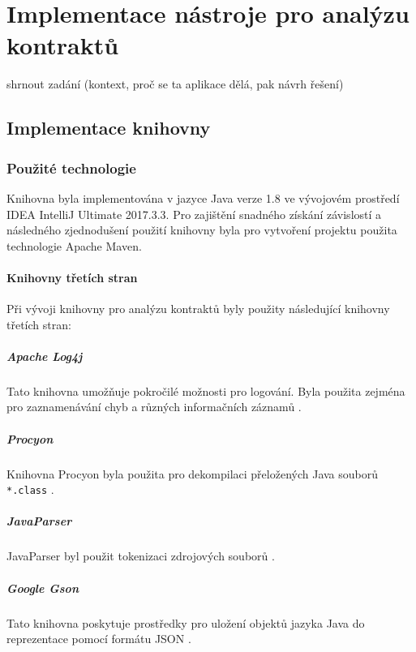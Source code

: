 \chapter{Implementace nástroje pro analýzu kontraktů}

	shrnout zadání (kontext, proč se ta aplikace dělá, pak návrh řešení) 

	\section{Implementace knihovny}
	    \subsection{Použité technologie}
			Knihovna byla implementována v jazyce Java verze 1.8 ve vývojovém prostředí IDEA IntelliJ Ultimate 2017.3.3. Pro zajištění snadného získání závislostí a následného zjednodušení použití knihovny byla pro vytvoření projektu použita technologie Apache Maven.
			
		\subsubsection{Knihovny třetích stran}
			Při vývoji knihovny pro analýzu kontraktů byly použity následující knihovny třetích stran:
			
			\paragraph{Apache Log4j} 
				Tato knihovna umožňuje pokročilé možnosti pro logování. Byla použita zejména pro zaznamenávání chyb a různých informačních záznamů \cite{log4j}.
				
			\paragraph{Procyon}
				Knihovna Procyon byla použita pro dekompilaci přeložených Java souborů \texttt{*.class} \cite{procyon}.
				
			\paragraph{JavaParser}
				JavaParser byl použit tokenizaci zdrojových souborů \cite{javaparser}. 
				
			\paragraph{Google Gson}
				Tato knihovna poskytuje prostředky pro uložení objektů jazyka Java do reprezentace pomocí formátu JSON \cite{gson}. 
				
